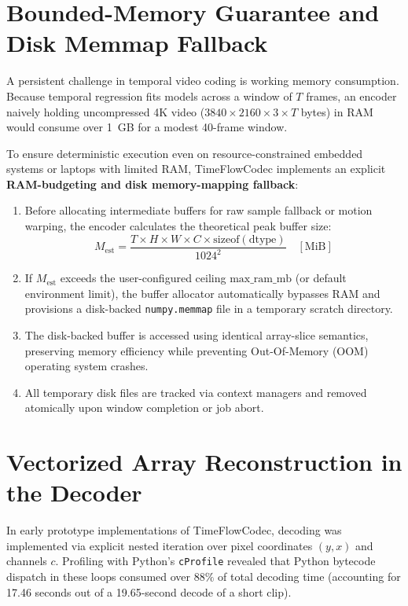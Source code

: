 \section{Bounded-Memory Guarantee and Disk Memmap Fallback}
A persistent challenge in temporal video coding is working memory consumption. Because temporal regression fits models across a window of $T$ frames, an encoder naively holding uncompressed 4K video ($3840 \times 2160 \times 3 \times T$ bytes) in RAM would consume over 1~GB for a modest 40-frame window.

To ensure deterministic execution even on resource-constrained embedded systems or laptops with limited RAM, TimeFlowCodec implements an explicit \textbf{RAM-budgeting and disk memory-mapping fallback}:
\begin{enumerate}
    \item Before allocating intermediate buffers for raw sample fallback or motion warping, the encoder calculates the theoretical peak buffer size:
    \begin{equation}
        M_{\text{est}} = \frac{T \times H \times W \times C \times \text{sizeof}(\text{dtype})}{1024^2} \quad [\text{MiB}]
    \end{equation}
    \item If $M_{\text{est}}$ exceeds the user-configured ceiling $\text{max\_ram\_mb}$ (or default environment limit), the buffer allocator automatically bypasses RAM and provisions a disk-backed \texttt{numpy.memmap} file in a temporary scratch directory.
    \item The disk-backed buffer is accessed using identical array-slice semantics, preserving memory efficiency while preventing Out-Of-Memory (OOM) operating system crashes.
    \item All temporary disk files are tracked via context managers and removed atomically upon window completion or job abort.
\end{enumerate}

\section{Vectorized Array Reconstruction in the Decoder}
In early prototype implementations of TimeFlowCodec, decoding was implemented via explicit nested iteration over pixel coordinates $(y, x)$ and channels $c$. Profiling with Python's \texttt{cProfile} revealed that Python bytecode dispatch in these loops consumed over $88\%$ of total decoding time (accounting for 17.46 seconds out of a 19.65-second decode of a short clip).


